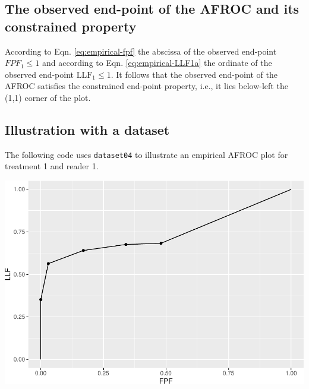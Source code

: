 \documentclass[
]{book}
\newenvironment{Shaded}{\begin{snugshade}}{\end{snugshade}}
\newcommand{\AttributeTok}[1]{\textcolor[rgb]{0.77,0.63,0.00}{#1}}
\newcommand{\DecValTok}[1]{\textcolor[rgb]{0.00,0.00,0.81}{#1}}
\newcommand{\FunctionTok}[1]{\textcolor[rgb]{0.00,0.00,0.00}{#1}}
\newcommand{\NormalTok}[1]{#1}
\newcommand{\OtherTok}[1]{\textcolor[rgb]{0.56,0.35,0.01}{#1}}
\newcommand{\SpecialCharTok}[1]{\textcolor[rgb]{0.00,0.00,0.00}{#1}}
\newcommand{\StringTok}[1]{\textcolor[rgb]{0.31,0.60,0.02}{#1}}
\begin{document}
\hypertarget{empirical-AFROC-constrained}{%
\subsection{The observed end-point of the AFROC and its constrained property}\label{empirical-AFROC-constrained}}

According to Eqn. \eqref{eq:empirical-fpf} the abscissa of the observed end-point \(FPF_1 \leq 1\) and according to Eqn. \eqref{eq:empirical-LLF1a} the ordinate of the observed end-point \(\text{LLF}_1 \leq 1\). It follows that the observed end-point of the AFROC satisfies the constrained end-point property, i.e., it lies below-left the (1,1) corner of the plot.

\hypertarget{empirical-afroc-plot-illustration}{%
\subsection{Illustration with a dataset}\label{empirical-afroc-plot-illustration}}

The following code uses \texttt{dataset04} to illustrate an empirical AFROC plot for treatment 1 and reader 1.

\begin{Shaded}
\end{Shaded}

\includegraphics{03-empirical_files/figure-latex/unnamed-chunk-7-1.pdf}
\end{document}
